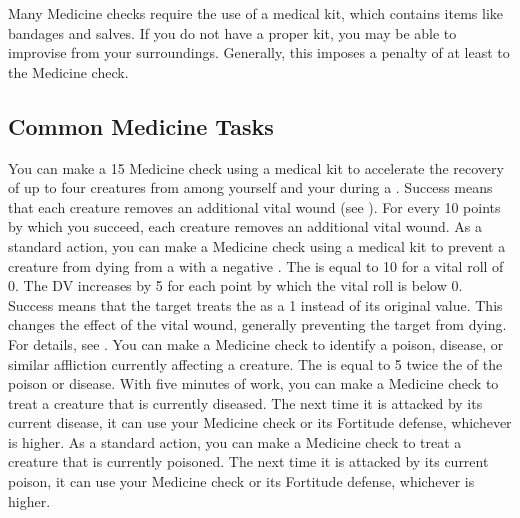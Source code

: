     Many Medicine checks require the use of a medical kit, which contains items like bandages and salves.
    If you do not have a proper kit, you may be able to improvise from your surroundings.
    Generally, this imposes a penalty of at least  to the Medicine check.

    \subsection{Common Medicine Tasks}
            You can make a  15 Medicine check using a medical kit to accelerate the recovery of up to four creatures from among yourself and your  during a .
            Success means that each creature removes an additional vital wound (see ).
            For every 10 points by which you succeed, each creature removes an additional vital wound.
            As a standard action, you can make a Medicine check using a medical kit to prevent a creature from dying from a  with a negative .
            The  is equal to 10 for a vital roll of 0.
            The DV increases by 5 for each point by which the vital roll is below 0.
            Success means that the target treats the  as a 1 instead of its original value.
            This changes the effect of the vital wound, generally preventing the target from dying.
            For details, see .
            You can make a Medicine check to identify a poison, disease, or similar affliction currently affecting a creature.
            The  is equal to 5 \add twice the  of the poison or disease.
         With five minutes of work, you can make a Medicine check to treat a creature that is currently diseased.
            The next time it is attacked by its current disease, it can use your Medicine check or its Fortitude defense, whichever is higher.
         As a standard action, you can make a Medicine check to treat a creature that is currently poisoned.
            The next time it is attacked by its current poison, it can use your Medicine check or its Fortitude defense, whichever is higher.

